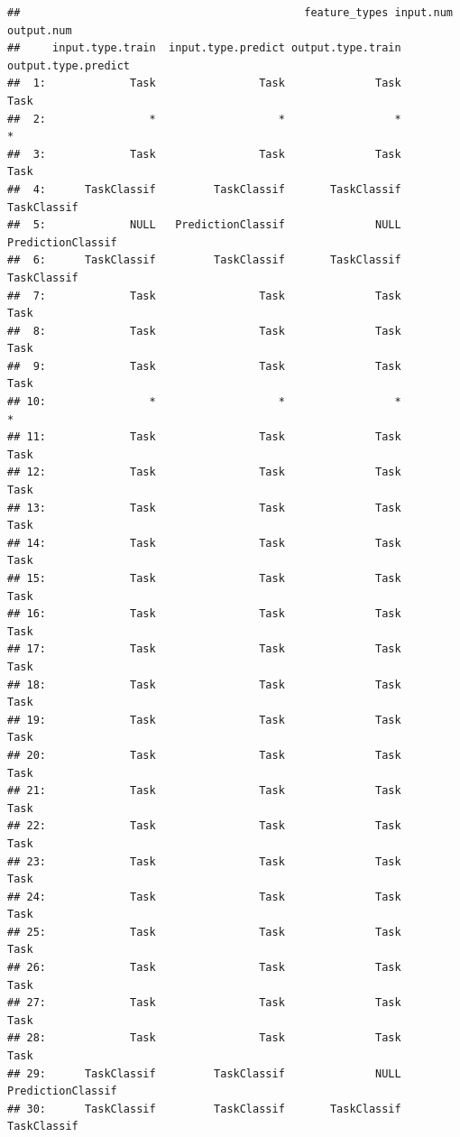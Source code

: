 \documentclass[
]{scrbook}
\begin{document}
\begin{verbatim}
##                                            feature_types input.num output.num
##     input.type.train  input.type.predict output.type.train output.type.predict
##  1:             Task                Task              Task                Task
##  2:                *                   *                 *                   *
##  3:             Task                Task              Task                Task
##  4:      TaskClassif         TaskClassif       TaskClassif         TaskClassif
##  5:             NULL   PredictionClassif              NULL   PredictionClassif
##  6:      TaskClassif         TaskClassif       TaskClassif         TaskClassif
##  7:             Task                Task              Task                Task
##  8:             Task                Task              Task                Task
##  9:             Task                Task              Task                Task
## 10:                *                   *                 *                   *
## 11:             Task                Task              Task                Task
## 12:             Task                Task              Task                Task
## 13:             Task                Task              Task                Task
## 14:             Task                Task              Task                Task
## 15:             Task                Task              Task                Task
## 16:             Task                Task              Task                Task
## 17:             Task                Task              Task                Task
## 18:             Task                Task              Task                Task
## 19:             Task                Task              Task                Task
## 20:             Task                Task              Task                Task
## 21:             Task                Task              Task                Task
## 22:             Task                Task              Task                Task
## 23:             Task                Task              Task                Task
## 24:             Task                Task              Task                Task
## 25:             Task                Task              Task                Task
## 26:             Task                Task              Task                Task
## 27:             Task                Task              Task                Task
## 28:             Task                Task              Task                Task
## 29:      TaskClassif         TaskClassif              NULL   PredictionClassif
## 30:      TaskClassif         TaskClassif       TaskClassif         TaskClassif

\end{verbatim}
\end{document}
